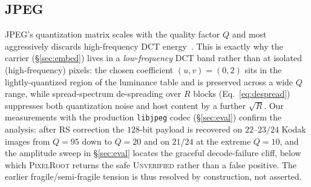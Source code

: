 \documentclass[journal]{IEEEtran}
\newcommand{\pr}{\textup{\textsc{PixelRoot}}}
\begin{document}
\ifshort
\else
\subsection{JPEG}
JPEG's quantization matrix scales with the quality factor $Q$ and most
aggressively discards high-frequency DCT energy~\cite{wallace1992jpeg}. This is
exactly why the carrier (\S\ref{sec:embed}) lives in a
\emph{low-frequency} DCT band rather than at isolated (high-frequency) pixels:
the chosen coefficient $(u,v)\!=\!(0,2)$ sits in the lightly-quantized region of
the luminance table and is preserved across a wide $Q$ range, while
spread-spectrum de-spreading over $R$ blocks (Eq.~\ref{eq:despread}) suppresses
both quantization noise and host content by a further $\sqrt{R}$. Our
measurements with the production \texttt{libjpeg} codec (\S\ref{sec:eval})
confirm the analysis: after RS correction the $128$-bit payload is recovered on
$22$--$23/24$ Kodak images from $Q\!=\!95$ down to $Q\!=\!20$ and on $21/24$ at the
extreme $Q\!=\!10$, and the amplitude sweep in \S\ref{sec:eval} locates the
graceful decode-failure cliff, below which \pr{} returns the safe
\textsc{Unverified} rather than a false positive. The earlier fragile/semi-fragile
tension is thus resolved by construction, not asserted.

\fi
\end{document}
